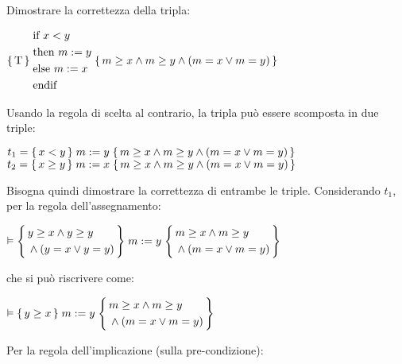 \begin{exmp}
    Dimostrare la correttezza della tripla:
    \begin{center}
        $\Hoaretriple{\textnormal{T}}
        {\begin{aligned}
            & \textnormal{if } x<y\\
            & \textnormal{then } m:=y\\
            & \textnormal{else } m:=x\\
            & \textnormal{endif}
        \end{aligned}}
        {m \ge x \land m \ge y \land (m=x \lor m=y)}$
    \end{center}
    Usando la regola di scelta al contrario, la tripla può essere scomposta in due triple:
    \begin{center}
        $t_1 = \Hoaretriple{x<y}{m:=y}{m \ge x \land m \ge y \land (m=x \lor m=y)}$\\
        $t_2 = \Hoaretriple{x \ge y}{m:=x}{m \ge x \land m \ge y \land (m=x \lor m=y)}$
    \end{center}
    Bisogna quindi dimostrare la correttezza di entrambe le triple.
    Considerando $t_1$, per la regola dell'assegnamento:
    \begin{center}
        $\vDash \Hoaretriple{\begin{aligned}
            &y \ge x \land y \ge y\\
            &\land (y = x \lor y = y)
        \end{aligned}}
        {m:=y}
        {\begin{aligned}
            &m \ge x \land m \ge y\\
            &\land (m=x \lor m=y)
        \end{aligned}}$
    \end{center}
    che si può riscrivere come:
    \begin{center}
        $\vDash \Hoaretriple{y \ge x}{m:=y}
        {\begin{aligned}
            &m \ge x \land m \ge y\\
            &\land (m=x \lor m=y)
        \end{aligned}}$
    \end{center}
    Per la regola dell'implicazione (sulla pre-condizione):
    \begin{prooftree}
\end{prooftree}
\end{exmp}
